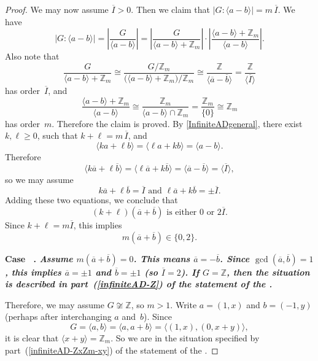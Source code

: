 \documentclass[11pt]{amsart}
\theoremstyle{definition}
\newcounter{case}
\newcounter{startcases}
\numberwithin{case}{startcases}
\newenvironment{case}[1][\unskip]{\refstepcounter{case}\bf
	\medskip \noindent Case \thecase\ #1. \it}{\unskip\upshape}
\renewcommand{\thecase}{\Roman{case}}
\numberwithin{equation}{section}
\newcommand{\Z}{\mathbb{Z}}  %
\begin{document}
\begin{proof}
		We may now assume $\overline I > 0$. 
		Then we claim that $|G : \langle a - b \rangle| = m \, \overline I$. 
		We have
		\[ | G : \langle a - b \rangle |
		= \left| \frac{G}{\langle a - b \rangle} \right|
		= \left| \frac{G}{\langle a - b \rangle + \Z_m} \right| \cdot \left| \frac{\langle a - b \rangle + \Z_m}{\langle a - b \rangle} \right|
		. \]
		Also note that
		\[ \frac{G}{\langle a - b \rangle + \Z_m}
		\cong \frac{G / \Z_m}{\bigl( \langle a - b \rangle + \Z_m \bigr) / \Z_m}
		\cong \frac{\Z}{\langle \overline a - \overline b \rangle}
		= \frac{\Z}{\langle \overline I \rangle} \]
		has order~$\overline I$, and
		\[ \frac{\langle a - b \rangle + \Z_m}{\langle a - b \rangle}
		\cong \frac{\Z_m}{\langle a - b \rangle \cap \Z_m}
		= \frac{\Z_m}{\{0\}}
		\cong \Z_m \]
		has order~$m$. 
		Therefore the claim is proved.
		By \cref{InfiniteADgeneral}, there exist $k, \ell \ge 0$, such that $k + \ell = m \, \overline I$, and 
		\[ \langle k a + \ell b \rangle
		= \langle \ell a + k b \rangle
		= \langle a - b \rangle . \]
		Therefore
		\[ \langle k \overline a + \ell \overline b \rangle
		= \langle \ell \overline a + k \overline b \rangle
		= \langle \overline a - \overline b \rangle 
		= \langle \overline I \rangle, \]
		so we may assume
		\[ \text{$k \overline a + \ell \overline b = \overline I$ and $\ell \overline a + k \overline b = \pm \overline I$} . \]
		Adding these two equations, we conclude that 
		\[ \text{$(k + \ell)(\overline a + \overline b)$ is either $0$ or~$2 \overline I$.} \]
		Since $k + \ell = m \overline I$, this implies
		\[ m(\overline a + \overline b) \in \{0, 2\} . \]
		
		\begin{case}
			Assume $m(\overline a + \overline b) = 0$.
		\end{case}
		This means $\overline a = - \overline b$. Since $\gcd(\overline a, \overline b) = 1$, this implies $\overline a = \pm 1$ and $\overline b = \pm 1$ (so $\overline I = 2$). If $G = \Z$, then the situation is described in part~(\ref{infiniteAD-Z}) of the statement of the . 
		
		Therefore, we may assume $G \not\cong \Z$, so $m > 1$. Write $a = (1, x)$ and $b = (-1, y)$ (perhaps after interchanging $a$ and~$b$). Since 
		\[ G 
		= \langle a, b \rangle
		= \langle a, a + b \rangle
		= \langle (1, x), (0, x + y) \rangle
		,\]
		it is clear that $\langle x + y \rangle = \Z_m$. So we are in the situation specified by part~(\ref{infiniteAD-ZxZm-xy}) of the statement of the . 
		

\end{proof}
\end{document}
